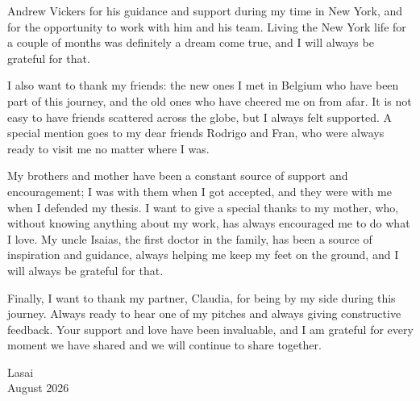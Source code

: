 Andrew Vickers for his guidance and support during my time in New York, and for the opportunity to work with him and his team. Living the New York life for a couple of months was definitely a dream come true, and I will always be grateful for that.

\vspace{1em}

I also want to thank my friends: the new ones I met in Belgium who have been part of this journey, and the old ones who have cheered me on from afar. It is not easy to have friends scattered across the globe, but I always felt supported. A special mention goes to my dear friends Rodrigo and Fran, who were always ready to visit me no matter where I was.

My brothers and mother have been a constant source of support and encouragement; I was with them when I got accepted, and they were with me when I defended my thesis. I want to give a special thanks to my mother, who, without knowing anything about my work, has always encouraged me to do what I love. My uncle Isaias, the first doctor in the family, has been a source of inspiration and guidance, always helping me keep my feet on the ground, and I will always be grateful for that.

Finally, I want to thank my partner, Claudia, for being by my side during this journey. Always ready to hear one of my pitches and always giving constructive feedback. Your support and love have been invaluable, and I am grateful for every moment we have shared and we will continue to share together.



{\raggedleft
Lasai \\
August 2026 \\
}